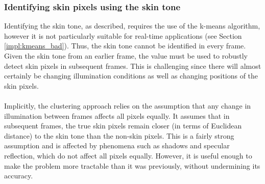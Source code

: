 \subsubsection{Identifying skin pixels using the skin tone}
Identifying the skin tone, as described, requires the use of the k-means algorithm,
however it is not particularly suitable for real-time applications (see Section \ref{impl:kmeans_bad}). Thus, the skin tone cannot be identified in every frame.
Given the skin tone from an earlier frame, the value must be used to robustly detect skin pixels in subsequent frames. This is challenging since there will almost certainly be changing illumination conditions as well as changing positions of the skin pixels.
\\ \\
Implicitly, the clustering approach relies on the assumption that any change in illumination between frames affects all pixels equally. 
It assumes that in subsequent frames, the true skin pixels remain closer (in terms of Euclidean distance) to the skin tone than the non-skin pixels.
This is a fairly strong assumption and is affected by phenomena such as shadows and specular reflection, which do not affect all pixels equally.
However, it is useful enough to make the problem more tractable than it was previously, without undermining its accuracy. %
